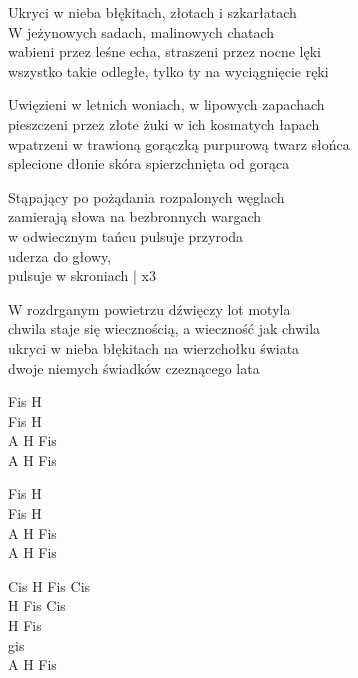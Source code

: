 \begin{text}
    \begin{smallTwo}
    Ukryci w nieba błękitach, złotach i szkarłatach\\
    W jeżynowych sadach, malinowych chatach\\
    wabieni przez leśne echa, straszeni przez nocne lęki\\
    wszystko takie odległe, tylko ty na wyciągnięcie ręki

    Uwięzieni w letnich woniach, w lipowych zapachach\\
    pieszczeni przez złote żuki w ich kosmatych łapach\\
    wpatrzeni w trawioną gorączką purpurową twarz słońca\\
    splecione dłonie skóra spierzchnięta od gorąca

    Stąpający po pożądania rozpalonych węglach\\
    zamierają słowa na bezbronnych wargach\\
    w odwiecznym tańcu pulsuje przyroda\\
    uderza do głowy,\\
    pulsuje w skroniach | x3

    W rozdrganym powietrzu dźwięczy lot motyla\\
    chwila staje się wiecznością, a wieczność jak chwila\\
    ukryci w nieba błękitach na wierzchołku świata\\
    dwoje niemych świadków czeznącego lata
\end{smallTwo}
\end{text}
\begin{chord}
    \begin{smallTwo}
    Fis H\\
    Fis H\\
    A H Fis\\
    A H Fis

    Fis H\\
    Fis H\\
    A H Fis\\
    A H Fis

    Cis H Fis Cis\\
    H Fis Cis\\
    H Fis\\
    gis\\
    A H Fis
\end{smallTwo}
\end{chord}